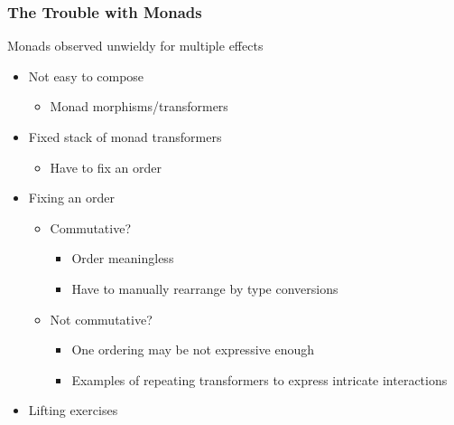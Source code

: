 \documentclass{beamer}
\begin{document}
\begin{frame}
  \frametitle{The Trouble with Monads}

  Monads observed unwieldy for multiple effects

  \vfill
  \pause

  \begin{itemize}
  \item Not easy to compose
    \begin{itemize}
    \item Monad morphisms/transformers
    \end{itemize}
  \pause
  \item Fixed stack of monad transformers
    \begin{itemize}
    \item Have to fix an order
    \end{itemize}
  \pause
  \item Fixing an order
    \begin{itemize}
    \pause
    \item Commutative?
      \begin{itemize}
      \item Order meaningless
      \item Have to manually rearrange by type conversions
      \end{itemize}
    \pause
    \item Not commutative?
      \begin{itemize}
      \item One ordering may be not expressive enough
      \item Examples of repeating transformers to express intricate interactions
      \end{itemize}
    \end{itemize}
  \pause
  \item Lifting exercises
  \end{itemize}
\end{frame}
\end{document}
